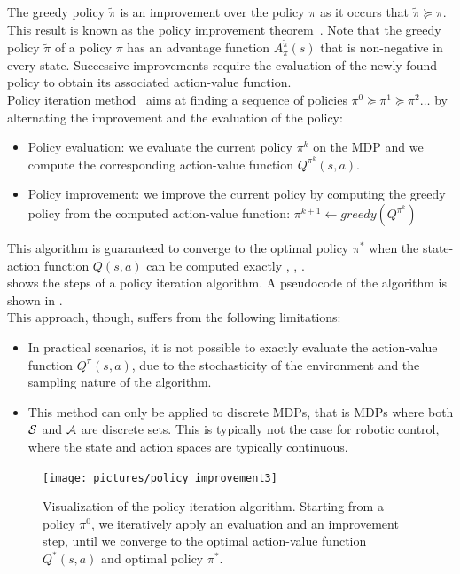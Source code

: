 The greedy policy $\tilde{\pi}$ is an improvement over the policy $\pi$ as it occurs that $\tilde{\pi}\succcurlyeq\pi$. This result is known as the policy improvement theorem~\cite{BELLMAN1958228}. Note that the greedy policy $\tilde{\pi}$ of a policy $\pi$ has an advantage function $A_{\pi}^{\tilde{\pi}}(s)$ that is non-negative in every state. Successive improvements require the evaluation of the newly found policy to obtain its associated action-value function.\\
Policy iteration method~\cite{howard:dp} aims at finding a sequence of policies $\pi^0 \succcurlyeq \pi^1  \succcurlyeq \pi^2 \ldots$ by alternating the improvement and the evaluation of the policy:
\begin{itemize}
\item Policy evaluation: we evaluate the current policy $\pi^k$ on the MDP and we compute the corresponding action-value function $Q^{\pi^k}(s,a)$.
\item Policy improvement: we improve the current policy by computing the greedy policy from the computed action-value function: $\pi^{k+1} \gets greedy\left( Q^{\pi^k} \right)$
\end{itemize}

This algorithm is guaranteed to converge to the optimal policy $\pi^*$ when the state-action function $Q(s,a)$ can be computed exactly \cite{10.2307/3689239}, \cite{6796861}, \cite{Tsitsiklis:2003:COP:944919.944922}.\\
 shows the steps of a policy iteration algorithm. A pseudocode of the algorithm is shown in .\\
This approach, though, suffers from the following limitations:
\begin{itemize}
\item In practical scenarios, it is not possible to exactly evaluate the action-value function $Q^\pi(s,a)$, due to the stochasticity of the environment and the sampling nature of the algorithm.
\item This method can only be applied to discrete MDPs, that is MDPs where both $\mathcal{S}$ and $\mathcal{A}$ are discrete sets. This is typically not the case for robotic control, where the state and action spaces are typically continuous.
\end{itemize}

\begin{figure}[t]
\centering
\texttt{[image: pictures/policy\_improvement3]}
\caption[Visualization of policy iteration algorithm.]{Visualization of the policy iteration algorithm. Starting from a policy $\pi^0$, we iteratively apply an evaluation and an improvement step, until we converge to the optimal action-value function $Q^*(s,a)$ and optimal policy $\pi^*$.}
\label{fig:policy-iteration}
\end{figure}

